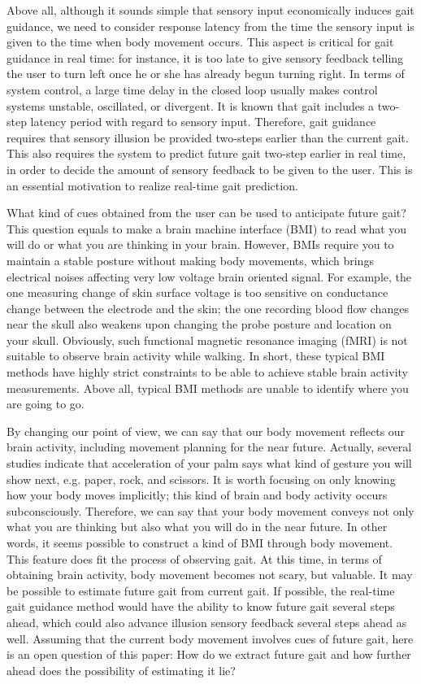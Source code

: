 \documentclass{sigchi}
\begin{document}
Above all, although it sounds simple that sensory input economically induces gait guidance, we need to consider response latency from the time the sensory input is given to the time when body movement occurs. This aspect is critical for gait guidance in real time: for instance, it is too late to give sensory feedback telling the user to turn left once he or she has already begun turning right. In terms of system control, a large time delay in the closed loop usually makes control systems unstable, oscillated, or divergent. It is known that gait includes a two-step latency period with regard to sensory input. Therefore, gait guidance requires that sensory illusion be provided two-steps earlier than the current gait. This also requires the system to predict future gait two-step earlier in real time, in order to decide the amount of sensory feedback to be given to the user. This is an essential motivation to realize real-time gait prediction.


What kind of cues obtained from the user can be used to anticipate future gait? This question equals to make a brain machine interface (BMI) to read what you will do or what you are thinking in your brain. However, BMIs require you to maintain a stable posture without making body movements, which brings electrical noises affecting very low voltage brain oriented signal\cite{PFURTSCHELLER2006145,OLNEY19859}. For example, the one measuring change of skin surface voltage is too sensitive on conductance change between the electrode and the skin; the one recording blood flow changes near the skull also weakens upon changing the probe posture and location on your skull. Obviously, such functional magnetic resonance imaging (fMRI) is not suitable to observe brain activity while walking. In short, these typical BMI methods have highly strict constraints to be able to achieve stable brain activity measurements. Above all, typical BMI methods are unable to identify  where you are going to go.

By changing our point of view, we can say that our body movement reflects\cite{VANEMMERIK19961175} our brain activity, including movement planning for the near future\cite{MORRIS1973729,ZIJLSTRA1997249}.%
 Actually, several studies indicate that acceleration of your palm says what kind of gesture you will show next, e.g. paper, rock, and scissors. It is worth focusing on only knowing how your body moves implicitly; this kind of brain and body activity occurs subconsciously. Therefore, we can say that your body movement conveys not only what you are thinking but also what you will do in the near future. In other words, it seems possible to construct a kind of BMI through body movement. This feature does fit the process of observing gait. At this time, in terms of obtaining brain activity, body movement becomes not scary, but valuable. It may be possible to estimate future gait from current gait. If possible, the real-time gait guidance method would have the ability to know future gait several steps ahead, which could also advance illusion sensory feedback several steps ahead as well. 
Assuming that the current body movement involves cues of future gait, here is an open question of this paper: How do we extract future gait and how further ahead does the possibility of estimating it lie?
\end{document}
